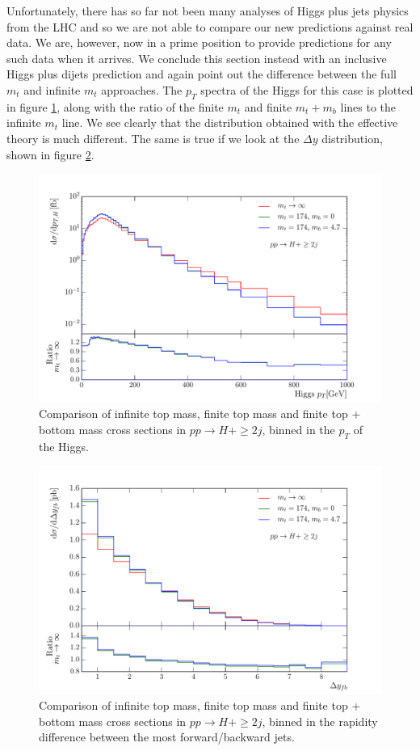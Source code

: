Unfortunately, there has so far not been many analyses of Higgs plus jets physics from the LHC and so we are not able to compare our new predictions against real data. We are, however, now in a prime position to provide predictions for any such data when it arrives. We conclude this section instead with an inclusive Higgs plus dijets prediction and again point out the difference between the full $m_t$ and infinite $m_t$ approaches. The $p_T$ spectra of the Higgs for this case is plotted in figure \ref{fig:hjj_ptH}, along with the ratio of the finite $m_t$ and finite $m_t + m_b$ lines to the infinite $m_t$ line. We see clearly that the distribution obtained with the effective theory is much different. The same is true if we look at the $\Delta y$ distribution, shown in figure \ref{fig:hjj_dy}. 

\begin{figure}[t]
\centering
\includegraphics[scale=0.64]{Images/Higgs_Plots/pth_compare_all.pdf}
\caption{Comparison of infinite top mass, finite top mass and finite top + bottom mass cross sections in $pp \to H+\geq2j$, binned in the $p_T$ of the Higgs.}
\label{fig:hjj_ptH}
\end{figure}

\begin{figure}[t]
\centering
\includegraphics[scale=0.64]{Images/Higgs_Plots/dyfb_compare_all.pdf}
\caption{Comparison of infinite top mass, finite top mass and finite top + bottom mass cross sections in $pp \to H+\geq2j$, binned in the rapidity difference between the most forward/backward jets.}
\label{fig:hjj_dy}
\end{figure}

